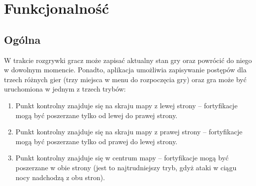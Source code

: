 \documentclass[12pt, a4paper]{article}
\begin{document}
\section{Funkcjonalność}

\subsection{Ogólna}
W trakcie rozgrywki gracz może zapisać aktualny stan gry oraz powrócić do niego w dowolnym momencie. Ponadto, aplikacja umożliwia zapisywanie postępów dla trzech różnych gier (trzy miejsca w menu do rozpoczęcia gry) oraz gra może być uruchomiona w jednym z trzech trybów:
\begin{enumerate}
\item Punkt kontrolny znajduje się na skraju mapy z lewej strony -- fortyfikacje mogą być poszerzane tylko od lewej do prawej strony.
\item Punkt kontrolny znajduje się na skraju mapy z prawej strony -- fortyfikacje mogą być poszerzane tylko od prawej do lewej strony.
\item Punkt kontrolny znajduje się w centrum mapy -- fortyfikacje mogą być poszerzane w obie strony (jest to najtrudniejszy tryb, gdyż ataki w ciągu nocy nadchodzą z obu stron).
\end{enumerate}
\end{document}
